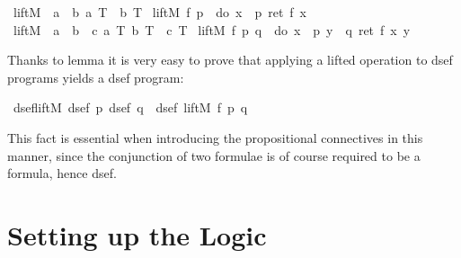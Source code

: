 \begin{isabellebody}
\isanewline
{}\isanewline
\ liftM\ {\isacharcolon}{\isacharcolon}\ {\isachardoublequote}{\isacharbrackleft}{\isacharprime}a\ {\isasymRightarrow}\ {\isacharprime}b{\isacharcomma}\ {\isacharprime}a\ T{\isacharbrackright}\ {\isasymRightarrow}\ {\isacharprime}b\ T{\isachardoublequote}\isanewline
\ {\isachardoublequote}liftM\ f\ p\ {\isasymequiv}\ do\ {\isacharbraceleft}x\ {\isasymleftarrow}\ p{\isacharsemicolon}\ ret\ {\isacharparenleft}f\ x{\isacharparenright}{\isacharbraceright}{\isachardoublequote}\isanewline
\ liftM{}\ {\isacharcolon}{\isacharcolon}\ {\isachardoublequote}{\isacharbrackleft}{\isacharprime}a\ {\isasymRightarrow}\ {\isacharprime}b\ {\isasymRightarrow}\ {\isacharprime}c{\isacharcomma}\ {\isacharprime}a\ T{\isacharcomma}\ {\isacharprime}b\ T{\isacharbrackright}\ {\isasymRightarrow}\ {\isacharprime}c\ T{\isachardoublequote}\isanewline
\ {\isachardoublequote}liftM{}\ f\ p\ q\ {\isasymequiv}\ do\ {\isacharbraceleft}x\ {\isasymleftarrow}\ p{\isacharsemicolon}\ y\ {\isasymleftarrow}\ q{\isacharsemicolon}\ ret\ {\isacharparenleft}f\ x\ y{\isacharparenright}{\isacharbraceright}{\isachardoublequote}\isanewline
\end{isabellebody}

Thanks to lemma  it is very easy to prove that applying a
lifted operation to dsef programs yields a dsef program:
\begin{isabellebody}
\isanewline
{}\ dsef{\isacharunderscore}liftM{}{\isacharcolon}\
{\isachardoublequote}{\isasymlbrakk}dsef\ p{\isacharsemicolon}\ dsef\
q{\isasymrbrakk}\ {\isasymLongrightarrow}\ dsef\
{\isacharparenleft}liftM{}\ f\ p\
q{\isacharparenright}{\isachardoublequote}\isanewline
\end{isabellebody}
\noindent This fact is essential when introducing the propositional connectives
in this manner, since \EG the conjunction of two formulae is of course required
to be a formula, hence dsef.

\section{Setting up the Logic}
\label{sec:setting-up-logic}

